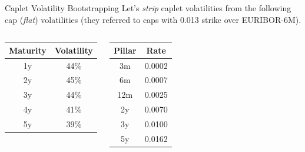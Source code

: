 \documentclass{beamer}
\begin{document}
\begin{frame}{Caplet Volatility Bootstrapping }
Let's \emph{strip} caplet volatilities from the following cap (\emph{flat}) volatilities (they referred to caps with 0.013 strike over EURIBOR-6M).
\begin{columns}
	\begin{center}
\begin{tabular}{|c|c|}
	\hline
	Maturity & Volatility \\
	\hline
	1y & 44\% \\
	\hline
	2y & 45\% \\
	\hline
	3y & 44\% \\
	\hline
	4y & 41\% \\
	\hline
	5y & 39\% \\
	\hline
\end{tabular}
\end{center}
\begin{center}
\begin{tabular}{|c|c|}
	\hline
	Pillar & Rate \\
	\hline
	3m & 0.0002 \\
	\hline
	6m & 0.0007 \\
	\hline
	12m & 0.0025 \\
	\hline
	2y & 0.0070 \\
	\hline
	3y & 0.0100 \\
	\hline
	5y & 0.0162 \\
	\hline
\end{tabular}
\end{center}
\end{columns}
\end{frame}
\end{document}
